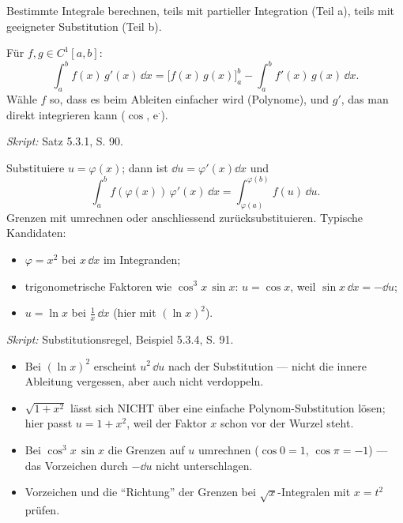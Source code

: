 

Bestimmte Integrale berechnen, teils mit partieller Integration (Teil a), teils
mit geeigneter Substitution (Teil b).

\begin{werkzeugkasten}
Für $f,g\in C^1[a,b]$:
\begin{equation}
  \int_a^b f(x)\,g'(x)\,\dd x
  = \bigl[f(x)\,g(x)\bigr]_a^b - \int_a^b f'(x)\,g(x)\,\dd x .
\end{equation}
Wähle $f$ so, dass es beim Ableiten einfacher wird (Polynome), und $g'$, das
man direkt integrieren kann ($\cos$, $\mathrm e^{\cdot}$).

\textit{Skript:} Satz 5.3.1, S. 90.
\end{werkzeugkasten}

\begin{werkzeugkasten}[Substitution]
Substituiere $u=\varphi(x)$; dann ist $\dd u=\varphi'(x)\dd x$ und
\begin{equation}
  \int_a^b f(\varphi(x))\,\varphi'(x)\,\dd x
  = \int_{\varphi(a)}^{\varphi(b)} f(u)\,\dd u .
\end{equation}
Grenzen mit umrechnen oder anschliessend zurücksubstituieren. Typische Kandidaten:
\begin{itemize}
  \item $\varphi=x^2$ bei $x\,\dd x$ im Integranden;
  \item trigonometrische Faktoren wie $\cos^3 x\,\sin x$: $u=\cos x$,
        weil $\sin x\,\dd x = -\dd u$;
  \item $u=\ln x$ bei $\frac{1}{x}\,\dd x$ (hier mit $(\ln x)^2$).
\end{itemize}
\textit{Skript:} Substitutionsregel, Beispiel 5.3.4, S. 91.
\end{werkzeugkasten}

\begin{achtung}
\begin{itemize}
  \item Bei $(\ln x)^2$ erscheint $u^2\,\dd u$ nach der Substitution — nicht
        die innere Ableitung vergessen, aber auch nicht verdoppeln.
  \item $\sqrt{1+x^2}$ lässt sich NICHT über eine einfache Polynom-Substitution
        lösen; hier passt $u=1+x^2$, weil der Faktor $x$ schon vor der Wurzel
        steht.
  \item Bei $\cos^3 x\,\sin x$ die Grenzen auf $u$ umrechnen
        ($\cos 0=1$, $\cos\pi=-1$) — das Vorzeichen durch $-\dd u$ nicht
        unterschlagen.
  \item Vorzeichen und die ``Richtung'' der Grenzen bei $\sqrt{x}$-Integralen
        mit $x=t^2$ prüfen.
\end{itemize}
\end{achtung}

